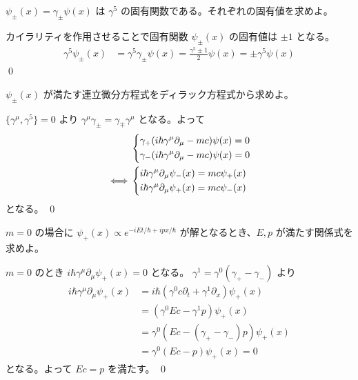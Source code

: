 \documentclass[uplatex,dvipdfmx,a4paper,11pt]{jlreq}
\makeatletter
\theoremstyle{definition}
\renewenvironment{proof}[1][\proofname]{\par
  \normalfont
  \topsep6\p@\@plus6\p@ \trivlist
  \item[\hskip\labelsep{\bfseries #1}\@addpunct{\bfseries}]\ignorespaces\quad\par
}{%
  \qed\endtrivlist\@endpefalse
}
\renewcommand\proofname{証明}
\numberwithin{equation}{section}
\makeatother
\begin{document}
\begin{problem}
$\psi_{\pm}(x) = \gamma_{\pm}\psi(x)$ は $\gamma^5$ の固有関数である。それぞれの固有値を求めよ。
\end{problem}
\begin{proof}
  カイラリティを作用させることで固有関数 $\psi_\pm(x)$ の固有値は $\pm 1$ となる。
  \begin{align}
    \gamma^5\psi_\pm(x) & = \gamma^5\gamma_\pm\psi(x) = \frac{\gamma^5 \pm 1}{2}\psi(x) = \pm\gamma^5\psi(x)
  \end{align}
\end{proof}

\begin{problem}
$\psi_\pm(x)$ が満たす連立微分方程式をディラック方程式から求めよ。
\end{problem}
\begin{proof}
  $\lbrace\gamma^\mu, \gamma^5\rbrace = 0$ より $\gamma^\mu\gamma_\pm = \gamma_\mp\gamma^\mu$ となる。よって
  \begin{align}
         & \begin{dcases}
             \gamma_+(i\hbar\gamma^\mu\partial_\mu - mc)\psi(x) = 0 \\
             \gamma_-(i\hbar\gamma^\mu\partial_\mu - mc)\psi(x) = 0 \\
           \end{dcases} \\
    \iff & \begin{dcases}
             i\hbar\gamma^\mu\partial_\mu\psi_-(x) = mc\psi_+(x) \\
             i\hbar\gamma^\mu\partial_\mu\psi_+(x) = mc\psi_-(x) \\
           \end{dcases}
  \end{align}
  となる。
\end{proof}

\begin{problem}
$m = 0$ の場合に $\psi_+(x) \propto e^{-iEt/\hbar+ipx/\hbar}$ が解となるとき、$E, p$ が満たす関係式を求めよ。
\end{problem}
\begin{proof}
  $m = 0$ のとき $i\hbar\gamma^\mu\partial_\mu\psi_+(x) = 0$ となる。 $\gamma^1 = \gamma^0(\gamma_+ - \gamma_-)$ より
  \begin{align}
    i\hbar\gamma^\mu\partial_\mu\psi_+(x) & = i\hbar(\gamma^0c\partial_t + \gamma^1\partial_x)\psi_+(x) \\
                                          & = (\gamma^0Ec - \gamma^1p)\psi_+(x)                         \\
                                          & = \gamma^0(Ec - (\gamma_+ - \gamma_-)p)\psi_+(x)            \\
                                          & = \gamma^0(Ec - p)\psi_+(x) = 0
  \end{align}
  となる。よって $Ec = p$ を満たす。
\end{proof}
\end{document}
